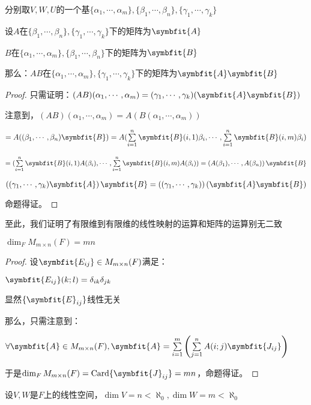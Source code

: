 \documentclass[12pt, a4paper, oneside, UTF8]{ctexbook}
\begin{document}
\begin{para}{0}
\begin{proposition}
						分别取$V,W,U$的一个基$\{\alpha_1,\cdots,\alpha_m\},\{\beta_1,\cdots,\beta_n\},\{\gamma_1,\cdots,\gamma_k\}$

						设$A$在$\{\beta_1,\cdots,\beta_n\},\{\gamma_1,\cdots,\gamma_k\}$下的矩阵为$\symbfit{A}$
						
						$B$在$\{\alpha_1,\cdots,\alpha_m\},\{\beta_1,\cdots,\beta_n\}$下的矩阵为$\symbfit{B}$

						那么：$AB$在$\{\alpha_1,\cdots,\alpha_m\},\{\gamma_1,\cdots,\gamma_k\}$下的矩阵为$\symbfit{A}\symbfit{B}$
					\end{proposition}
					\begin{proof}
						只需证明：$(AB)(\alpha_1,\cdots,\alpha_m)=(\gamma_1,\cdots,\gamma_k)(\symbfit{A}\symbfit{B})$
					
						注意到，$(AB)(\alpha_1,\cdots,\alpha_m)=A\left(B(\alpha_1,\cdots,\alpha_m)\right)$

						$=A((\beta_1,\cdots,\beta_n)\symbfit{B})=A(\sum\limits_{i=1}^{n}\symbfit{B}(i,1)\beta_i,\cdots,\sum\limits_{i=1}^{n}\symbfit{B}(i,m)\beta_i)$

						$=(\sum\limits_{i=1}^{n}\symbfit{B}(i,1)A(\beta_i),\cdots,\sum\limits_{i=1}^{n}\symbfit{B}(i,m)A(\beta_i))=\left(A(\beta_1),\cdots,A(\beta_n)\right)\symbfit{B}$

						$\left((\gamma_1,\cdots,\gamma_k)\symbfit{A}\right)\symbfit{B}=\left((\gamma_1,\cdots,\gamma_k)\right)(\symbfit{A}\symbfit{B})$
						
						命题得证。
					\end{proof}
					至此，我们证明了有限维到有限维的线性映射的运算和矩阵的运算别无二致
				\point{}
					\begin{proposition}
						$\dim_F M_{m \times n}(F) = mn$
					\end{proposition}
					\begin{proof}
						设$\symbfit{E_{ij}} \in M_{m \times n}(F)$满足：

						$\symbfit{E_{ij}}(k;l)=\delta_{ik}\delta_{jk}$

						显然$\{\symbfit{E}_{ij}\}$线性无关

						那么，只需注意到：

						$\forall \symbfit{A} \in M_{m \times n}(F),\symbfit{A} = \sum\limits_{i=1}^{m}\left(\sum\limits_{j=1}^{n}A(i;j)\symbfit{J_{ij}}\right)$
					
						于是$\dim_F M_{m \times n}(F)=\card \{\symbfit{J}_{ij}\}=mn$，命题得证。
					\end{proof}
				\point{}
					\begin{proposition}
						设$V,W$是$F$上的线性空间，$\dim V = n < \aleph_0,\dim W = m < \aleph_0$


\end{proposition}
\end{para}
\end{document}
